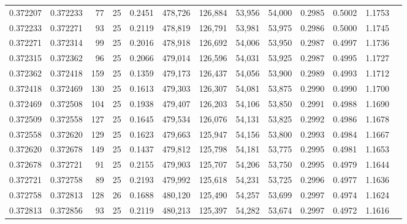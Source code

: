 \begin{tabular}{rrrrrrrrrrrrr}
0.372207 & 0.372233 &    77 &  25 &                                     0.2451 & 478,726 & 126,884 &  53,956 &  54,000 & 0.2985 & 0.5002 & 1.1753 \\
0.372233 & 0.372271 &    93 &  25 &                                     0.2119 & 478,819 & 126,791 &  53,981 &  53,975 & 0.2986 & 0.5000 & 1.1745 \\
0.372271 & 0.372314 &    99 &  25 &                                     0.2016 & 478,918 & 126,692 &  54,006 &  53,950 & 0.2987 & 0.4997 & 1.1736 \\
0.372315 & 0.372362 &    96 &  25 &                                     0.2066 & 479,014 & 126,596 &  54,031 &  53,925 & 0.2987 & 0.4995 & 1.1727 \\
0.372362 & 0.372418 &   159 &  25 &                                     0.1359 & 479,173 & 126,437 &  54,056 &  53,900 & 0.2989 & 0.4993 & 1.1712 \\
0.372418 & 0.372469 &   130 &  25 &                                     0.1613 & 479,303 & 126,307 &  54,081 &  53,875 & 0.2990 & 0.4990 & 1.1700 \\
0.372469 & 0.372508 &   104 &  25 &                                     0.1938 & 479,407 & 126,203 &  54,106 &  53,850 & 0.2991 & 0.4988 & 1.1690 \\
0.372509 & 0.372558 &   127 &  25 &                                     0.1645 & 479,534 & 126,076 &  54,131 &  53,825 & 0.2992 & 0.4986 & 1.1678 \\
0.372558 & 0.372620 &   129 &  25 &                                     0.1623 & 479,663 & 125,947 &  54,156 &  53,800 & 0.2993 & 0.4984 & 1.1667 \\
0.372620 & 0.372678 &   149 &  25 &                                     0.1437 & 479,812 & 125,798 &  54,181 &  53,775 & 0.2995 & 0.4981 & 1.1653 \\
0.372678 & 0.372721 &    91 &  25 &                                     0.2155 & 479,903 & 125,707 &  54,206 &  53,750 & 0.2995 & 0.4979 & 1.1644 \\
0.372721 & 0.372758 &    89 &  25 &                                     0.2193 & 479,992 & 125,618 &  54,231 &  53,725 & 0.2996 & 0.4977 & 1.1636 \\
0.372758 & 0.372813 &   128 &  26 &                                     0.1688 & 480,120 & 125,490 &  54,257 &  53,699 & 0.2997 & 0.4974 & 1.1624 \\
0.372813 & 0.372856 &    93 &  25 &                                     0.2119 & 480,213 & 125,397 &  54,282 &  53,674 & 0.2997 & 0.4972 & 1.1616 \\

\end{tabular}
